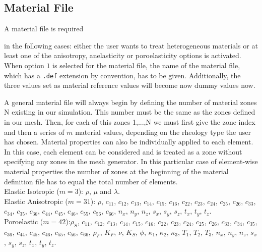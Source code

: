 \documentclass[12pt,twoside]{article}
\begin{document}
\newpage

\subsection{Material File}
\label{sec-matfile}

\hypertarget{material}{A material file is required} in the following cases:
either the user wants to treat heterogeneous materials or
at least one of the anisotropy, anelasticity or poroelasticity options is activated.
When option $1$ is selected for the material file, the name of the material file, which has a {\tt .def} extension by convention,
has to be given.
Additionally, the three values set as material reference values will become now dummy values now.

\noindent
A general material file will always begin by defining the number of material zones N existing in our simulation.
This number must be the same as the zones defined in our mesh.
Then, for each of this zones 1,...,N we must first give the zone index and then a series of $m$ material values,
depending on the rheology type the user has chosen.
Material properties can also be individually applied to each element.
In this case, each element can be considered and is treated as a zone without specifying any zones in the mesh generator.
In this particular case of element-wise material properties the number of zones at the beginning of
the material definition file has to equal the total number of elements.\\

\noindent
Elastic Isotropic ($m=3$): $\rho$, $\mu$ and $\lambda$.\\

\noindent
Elastic Anisotropic ($m=31$): $\rho$, $c_{11}$, $c_{12}$, $c_{13}$, $c_{14}$, $c_{15}$, $c_{16}$, $c_{22}$, $c_{23}$, $c_{24}$, $c_{25}$, $c_{26}$, $c_{33}$, $c_{34}$, $c_{35}$,
$c_{36}$, $c_{44}$, $c_{45}$, $c_{46}$, $c_{55}$, $c_{56}$, $c_{66}$, $n_x$, $n_y$, $n_z$, $s_x$, $s_y$, $s_z$, $t_x$, $t_y$, $t_z$.\\

\noindent
Poroelastic ($m=42$):$\rho_S$, $c_{11}$, $c_{12}$, $c_{13}$, $c_{14}$, $c_{15}$, $c_{16}$, $c_{22}$, $c_{23}$, $c_{24}$, $c_{25}$, $c_{26}$, $c_{33}$, $c_{34}$, $c_{35}$,
$c_{36}$, $c_{44}$, $c_{45}$, $c_{46}$, $c_{55}$, $c_{56}$, $c_{66}$, $\rho_F$, $K_F$, $\nu$, $K_S$, $\phi$, $\kappa_1$, $\kappa_2$, $\kappa_3$, $T_1$, $T_2$, $T_3$, $n_x$,
$n_y$, $n_z$, $s_x$, $s_y$, $s_z$, $t_x$, $t_y$, $t_z$.\\
\end{document}
